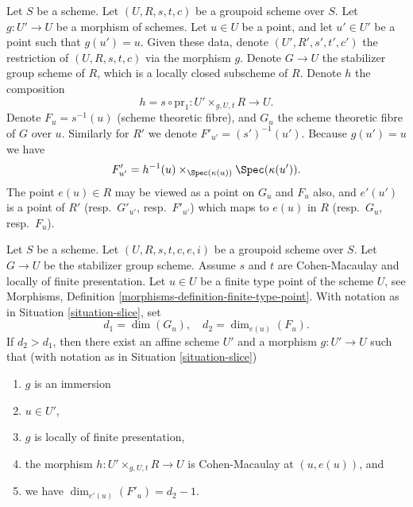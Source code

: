 \begin{situation}
\label{situation-slice}
Let $S$ be a scheme.
Let $(U, R, s, t, c)$ be a groupoid scheme over $S$.
Let $g : U' \to U$ be a morphism of schemes.
Let $u \in U$ be a point, and let $u' \in U'$ be a point such that
$g(u') = u$. Given these data, denote $(U', R', s', t', c')$
the restriction of $(U, R, s, t, c)$ via the morphism $g$.
Denote $G \to U$ the stabilizer group scheme of $R$, which
is a locally closed subscheme of $R$.
Denote $h$ the composition
$$
h = s \circ \text{pr}_1 : U' \times_{g, U, t} R \longrightarrow U.
$$
Denote $F_u = s^{-1}(u)$ (scheme theoretic fibre), and $G_u$ the
scheme theoretic fibre of $G$ over $u$.
Similarly for $R'$ we denote $F'_{u'} = (s')^{-1}(u')$.
Because $g(u') = u$ we have
$$
F'_{u'} = h^{-1}(u) \times_{\Spec(\kappa(u))} \Spec(\kappa(u')).
$$
The point $e(u) \in R$ may be viewed as a point on $G_u$ and $F_u$ also, and
$e'(u')$ is a point of $R'$ (resp.\ $G'_{u'}$, resp.\ $F'_{u'}$) which maps
to $e(u)$ in $R$ (resp.\ $G_u$, resp.\ $F_u$).
\end{situation}

\begin{lemma}
\label{lemma-slice}
Let $S$ be a scheme.
Let $(U, R, s, t, c, e, i)$ be a groupoid scheme over $S$.
Let $G \to U$ be the stabilizer group scheme.
Assume $s$ and $t$ are Cohen-Macaulay and locally of finite presentation.
Let $u \in U$ be a finite type point of the scheme $U$, see
Morphisms, Definition \ref{morphisms-definition-finite-type-point}.
With notation as in
Situation \ref{situation-slice},
set
$$
d_1 = \dim(G_u), \quad
d_2 = \dim_{e(u)}(F_u).
$$
If $d_2 > d_1$, then there exist an affine scheme $U'$
and a morphism $g : U' \to U$ such that (with notation as in
Situation \ref{situation-slice})
\begin{enumerate}
\item $g$ is an immersion
\item $u \in U'$,
\item $g$ is locally of finite presentation,
\item the morphism $h : U' \times_{g, U, t} R \longrightarrow U$
is Cohen-Macaulay at $(u, e(u))$, and
\item we have $\dim_{e'(u)}(F'_u) = d_2 - 1$.
\end{enumerate}
\end{lemma}

